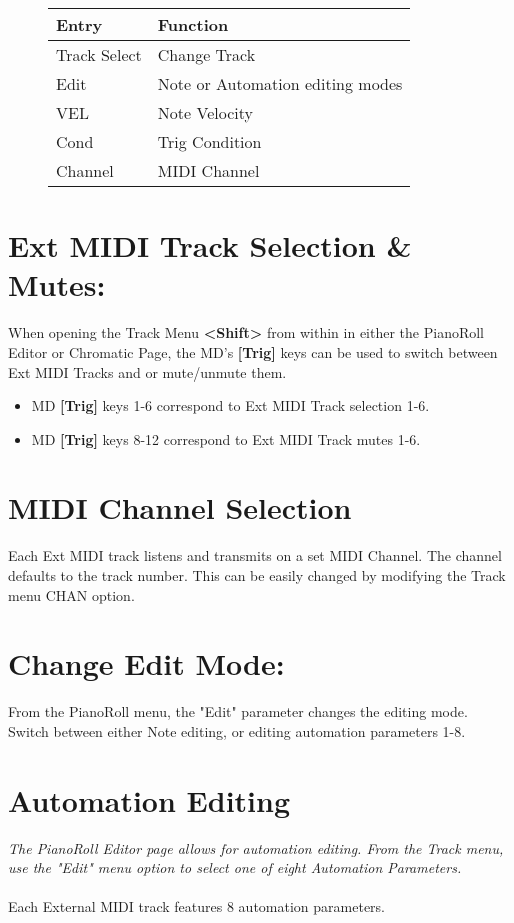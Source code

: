 \begin{figure}[hb]
    \begin{tabular}{|l|l|}
    \hline
    \rowcolor[HTML]{C0C0C0} 
    Entry        & Function \\ \hline
    Track Select & Change Track \\ \hline
    Edit         & Note or Automation editing modes\\ \hline
    VEL         & Note Velocity\\ \hline
    Cond        & Trig Condition\\ \hline
    Channel     & MIDI Channel\\ \hline
    \end{tabular}
\end{figure}
\section{Ext MIDI Track Selection \& Mutes:}
When opening the Track Menu \textbf{<Shift>} from within in either the PianoRoll Editor or Chromatic Page, the MD's \textbf{[Trig]} keys can be used to switch between Ext MIDI Tracks and or  mute/unmute them.
\begin{itemize}
    \item MD \textbf{[Trig]} keys 1-6 correspond to Ext MIDI Track selection 1-6.
    \item MD \textbf{[Trig]} keys 8-12 correspond to Ext MIDI Track mutes 1-6.
\end{itemize}

\section{MIDI Channel Selection}
Each Ext MIDI track listens and transmits on a set MIDI Channel. The channel defaults to the track number. This can be easily changed by modifying the Track  menu CHAN option.\\
\newpage
\section{Change Edit Mode:}
From the PianoRoll menu, the "Edit" parameter changes the editing mode. Switch between either Note editing, or editing automation parameters 1-8.

\section{Automation Editing}
\textit{The PianoRoll Editor page allows for automation editing. From the Track menu, use the "Edit" menu option to select one of eight Automation Parameters.}
\\\\
Each External MIDI track features 8 automation parameters.\\
